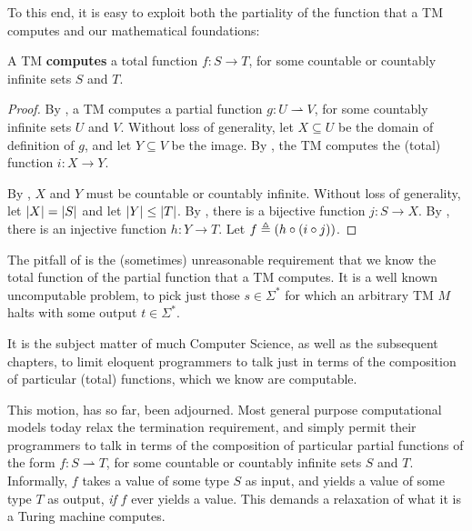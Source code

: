 To this end, it is easy to exploit both the partiality of the function that a
TM computes and our mathematical foundations:

\begin{theorem} \label{thm:tm-total} A TM \textbf{computes} a total function $f
: S \rightarrow T$, for some countable or countably infinite sets $S$ and $T$.
\end{theorem}

\begin{proof} By , a TM computes a partial
function $g : U \rightharpoonup V$, for some countably infinite sets $U$ and
$V$. Without loss of generality, let $X \subseteq U$ be the domain of
definition of $g$, and let $Y \subseteq V$ be the image. By
, the TM computes the (total) function $i : X
\rightarrow Y$.

By , $X$ and $Y$ must be countable or
countably infinite. Without loss of generality, let $\mathopen{}\left|{X}\right|\mathclose{}=\mathopen{}\left|{S}\right|\mathclose{}$ and let
$\mathopen{}\left|{Y}\right|\mathclose{}\leq\mathopen{}\left|{T}\right|\mathclose{}$. By , there is a bijective function $j
: S \rightarrow X$. By , there is an injective function $h : Y
\rightarrow T$. Let $f \triangleq \mathopen{}\left({h \circ \mathopen{}\left({i \circ j}\right)\mathclose{}}\right)\mathclose{}$.\end{proof}

The pitfall of  is the (sometimes) unreasonable requirement
that we know the total function of the partial function that a TM computes.
It is a well known uncomputable problem, to pick just those $s \in \Sigma^*$
for which an arbitrary TM $M$ halts with some output $t \in \Sigma^*$.


It is the subject matter of much Computer Science, as well as the subsequent
chapters, to limit eloquent programmers to talk just in terms of the
composition of particular (total) functions, which we know are computable.

This motion, has so far, been adjourned. Most general purpose computational
models today relax the termination requirement, and simply permit their
programmers to talk in terms of the composition of particular partial functions
of the form $f : S \rightharpoonup T$, for some countable or countably infinite
sets $S$ and $T$. Informally, $f$ takes a value of some type $S$ as input, and
yields a value of some type $T$ as output, \emph{if} $f$ ever yields a value.
This demands a relaxation of what it is a Turing machine computes.

